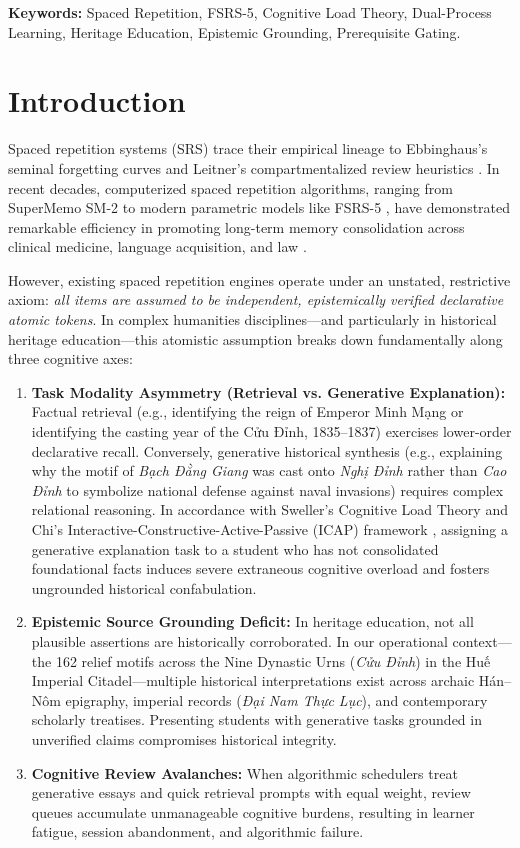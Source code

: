 \documentclass[11pt,a4paper]{article}
\begin{document}
\noindent\textbf{Keywords:} Spaced Repetition, FSRS-5, Cognitive Load Theory, Dual-Process Learning, Heritage Education, Epistemic Grounding, Prerequisite Gating.

\section{Introduction}
\label{sec:introduction}

Spaced repetition systems (SRS) trace their empirical lineage to Ebbinghaus's seminal forgetting curves \cite{ebbinghaus1885} and Leitner's compartmentalized review heuristics \cite{leitner1972}. In recent decades, computerized spaced repetition algorithms, ranging from SuperMemo SM-2 \cite{wozniak1990} to modern parametric models like FSRS-5 \cite{ye2024fsrs}, have demonstrated remarkable efficiency in promoting long-term memory consolidation across clinical medicine, language acquisition, and law \cite{roediger2006, karpicke2008, settles2016half, tabibian2019}.

However, existing spaced repetition engines operate under an unstated, restrictive axiom: \textit{all items are assumed to be independent, epistemically verified declarative atomic tokens}. In complex humanities disciplines---and particularly in historical heritage education---this atomistic assumption breaks down fundamentally along three cognitive axes:
\begin{enumerate}[leftmargin=*]
    \item \textbf{Task Modality Asymmetry (Retrieval vs. Generative Explanation):} Factual retrieval (e.g., identifying the reign of Emperor Minh Mạng or identifying the casting year of the Cửu Đỉnh, 1835--1837) exercises lower-order declarative recall. Conversely, generative historical synthesis (e.g., explaining why the motif of \textit{Bạch Đằng Giang} was cast onto \textit{Nghị Đỉnh} rather than \textit{Cao Đỉnh} to symbolize national defense against naval invasions) requires complex relational reasoning. In accordance with Sweller's Cognitive Load Theory \cite{sweller1988} and Chi's Interactive-Constructive-Active-Passive (ICAP) framework \cite{chi2009}, assigning a generative explanation task to a student who has not consolidated foundational facts induces severe extraneous cognitive overload and fosters ungrounded historical confabulation.
    \item \textbf{Epistemic Source Grounding Deficit:} In heritage education, not all plausible assertions are historically corroborated. In our operational context---the 162 relief motifs across the Nine Dynastic Urns (\textit{Cửu Đỉnh}) in the Huế Imperial Citadel---multiple historical interpretations exist across archaic Hán--Nôm epigraphy, imperial records (\textit{Đại Nam Thực Lục}), and contemporary scholarly treatises. Presenting students with generative tasks grounded in unverified claims compromises historical integrity.
    \item \textbf{Cognitive Review Avalanches:} When algorithmic schedulers treat generative essays and quick retrieval prompts with equal weight, review queues accumulate unmanageable cognitive burdens, resulting in learner fatigue, session abandonment, and algorithmic failure.
\end{enumerate}
\end{document}
